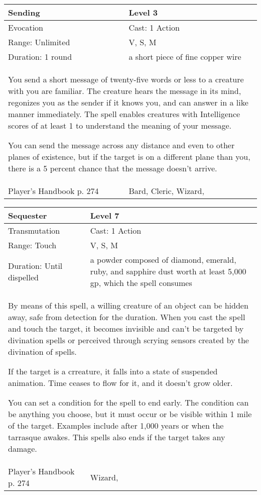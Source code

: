 \documentclass[11pt]{report}
\begin{document}
\begin{table}[H]
	\begin{tabular}{||p{6cm}|p{6cm}||}
		\hline\hline
		\bf{Sending} & Level 3\\ \hline
		Evocation & Cast: 1 Action\\ \hline
		Range: Unlimited & V, S, M\\ \hline
		Duration: 1 round & a short piece of fine copper wire\\ \hline
		\multicolumn{2}{||p{12cm}||}{You send a short message of twenty-five words or less to a creature with you are familiar. The creature hears the message in its mind, regonizes you as the sender if it knows you, and can answer in a like manner immediately. The spell enables creatures with Intelligence scores of at least 1 to understand the meaning of your message.

You can send the message across any distance and even to other planes of existence, but if the target is on a different plane than you, there is a 5 percent chance that the message doesn’t arrive.}\\ \hline
Player's Handbook p. 274 & Bard, Cleric, Wizard, \\ \hline\hline
	\end{tabular}
\end{table}

\begin{table}[H]
	\begin{tabular}{||p{6cm}|p{6cm}||}
		\hline\hline
		\bf{Sequester} & Level 7\\ \hline
		Transmutation & Cast: 1 Action\\ \hline
		Range: Touch & V, S, M\\ \hline
		Duration: Until dispelled & a powder composed of diamond, emerald, ruby, and sapphire dust worth at least 5,000 gp, which the spell consumes\\ \hline
		\multicolumn{2}{||p{12cm}||}{By means of this spell, a willing creature of an object can be hidden away, safe from detection for the duration.
When you cast the spell and touch the target, it becomes invisible and can’t be targeted by divination spells or perceived through scrying sensors created by the divination of spells.

If the target is a crreature, it falls into a state of suspended animation. Time ceases to flow for it, and it doesn’t grow older.

You can set a condition for the spell to end early. The condition can be anything you choose, but it must occur or be visible within 1 mile of the target. Examples include after 1,000 years or when the tarrasque awakes. This spells also ends if the target takes any damage.}\\ \hline
Player's Handbook p. 274 & Wizard, \\ \hline\hline
	\end{tabular}
\end{table}
\end{document}
